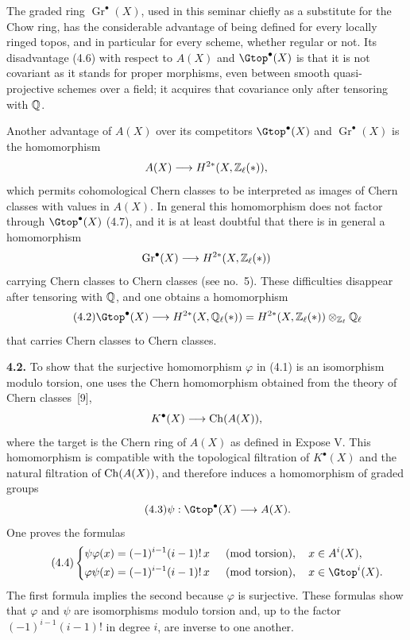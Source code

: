 The graded ring $\operatorname{Gr}^\bullet(X)$, used in this seminar chiefly
as a substitute for the Chow ring, has the considerable advantage of being
defined for every locally ringed topos, and in particular for every scheme,
whether regular or not. Its disadvantage (4.6) with respect to $A(X)$ and
$\Gtop^\bullet(X)$ is that it is not covariant as it stands for proper
morphisms, even between smooth quasi-projective schemes over a field; it
acquires that covariance only after tensoring with $\mathbb Q$.

Another advantage of $A(X)$ over its competitors $\Gtop^\bullet(X)$ and
$\operatorname{Gr}^\bullet(X)$ is the homomorphism
\[
 A(X)\longrightarrow H^{2*}(X,\mathbb Z_\ell(*)),
\]
which permits cohomological Chern classes to be interpreted as images of
Chern classes with values in $A(X)$. In general this homomorphism does not
factor through $\Gtop^\bullet(X)$ (4.7), and it is at least doubtful that
there is in general a homomorphism
\[
 \operatorname{Gr}^\bullet(X)\longrightarrow H^{2*}(X,\mathbb Z_\ell(*))
\]
carrying Chern classes to Chern classes (see no.~5). These difficulties
disappear after tensoring with $\mathbb Q$, and one obtains a homomorphism
\begin{equation*}\tag{4.2}
 \Gtop^\bullet(X)\longrightarrow H^{2*}(X,\Qell(*))
 =H^{2*}(X,\Zell(*))\otimes_{\Zell}\Qell
\end{equation*}
that carries Chern classes to Chern classes.

\noindent\textbf{4.2.}
To show that the surjective homomorphism $\varphi$ in (4.1) is an
isomorphism modulo torsion, one uses the Chern homomorphism obtained from the
theory of Chern classes~[9],
\[
 K^\bullet(X)\longrightarrow \operatorname{Ch}(A(X)),
\]
where the target is the Chern ring of $A(X)$ as defined in Expose V. This
homomorphism is compatible with the topological filtration of $K^\bullet(X)$
and the natural filtration of $\operatorname{Ch}(A(X))$, and therefore induces a
homomorphism of graded groups
\begin{equation*}\tag{4.3}
 \psi:\Gtop^\bullet(X)\longrightarrow A(X).
\end{equation*}
One proves the formulas
\begin{equation*}\tag{4.4}
\left\{
\begin{aligned}
 \psi\varphi(x)&=(-1)^{i-1}(i-1)!\,x
   &&\pmod{\text{torsion}},\quad x\in A^i(X),\\
 \varphi\psi(x)&=(-1)^{i-1}(i-1)!\,x
   &&\pmod{\text{torsion}},\quad x\in \Gtop^i(X).
\end{aligned}
\right.
\end{equation*}
The first formula implies the second because $\varphi$ is surjective. These
formulas show that $\varphi$ and $\psi$ are isomorphisms modulo torsion and,
up to the factor $(-1)^{i-1}(i-1)!$ in degree $i$, are inverse to one
another.


